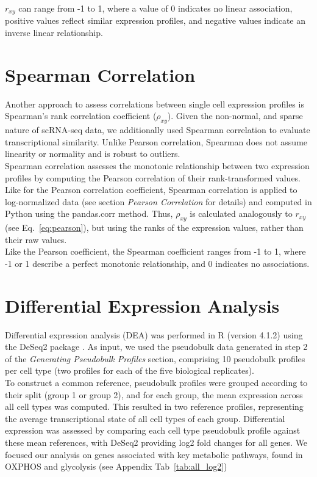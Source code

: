 $r_{xy}$ can range from -1 to 1, where a value of 0 indicates no linear association, positive values reflect similar expression profiles, and negative values indicate an inverse linear relationship.


\section{Spearman Correlation}
Another approach to assess correlations between single cell expression profiles is Spearman’s rank correlation coefficient ($\rho_{xy}$). Given the non-normal, and sparse nature of scRNA-seq data, we additionally used Spearman correlation to evaluate transcriptional similarity. Unlike Pearson correlation, Spearman does not assume linearity or normality and is robust to outliers. 
\\

Spearman correlation assesses the monotonic relationship between two expression profiles by computing the Pearson correlation of their rank-transformed values. Like for the Pearson correlation coefficient, Spearman correlation is applied to log-normalized data (see section \textit{Pearson Correlation} for details) and computed in Python using the pandas.corr method. Thus, $\rho_{xy}$ is calculated
analogously to $r_{xy}$ (see Eq.~\ref{eq:pearson}), but using the ranks of the expression values,
rather than their raw values. 
\\

Like the Pearson coefficient, the Spearman coefficient ranges from -1 to 1, where -1 or 1 describe a perfect monotonic relationship, and 0 indicates no associations.

\section{Differential Expression Analysis}
Differential expression analysis (\gls{DEA}) was performed in R (version 4.1.2) using the DeSeq2 package \citep{love2014differential} . As input, we used the pseudobulk data generated in step 2 of the \textit{Generating Pseudobulk Profiles} section, comprising 10 pseudobulk profiles per cell type (two profiles for each of the five biological replicates).
\\

To construct a common reference, pseudobulk profiles were grouped according to their split (group 1 or group 2), and for each group, the mean expression across all cell types was computed. This resulted in two reference profiles, representing the average transcriptional state of all cell types of each group. Differential expression was assessed by comparing each cell type pseudobulk profile against these mean references, with DeSeq2 providing log2 fold
changes  for all genes. We focused our analysis on genes associated with key metabolic pathways, found in OXPHOS and glycolysis (see Appendix Tab~\ref{tab:all_log2})



